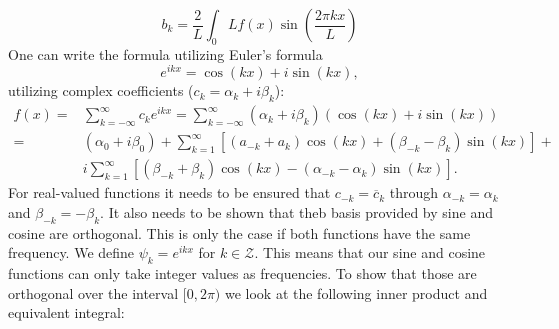 \documentclass[phd,black, hidelinks]{PrincetonThesis}
\newcommand{\compconj}[1]{\overline{#1}}
\newcommand{\euler}{e}
\begin{document}
\begin{equation}
b_k = \frac{2}{L} \int_{0}{L} f(x) \sin \left( \frac{2\pi kx}{L}  \right)
\end{equation}
One can write the formula utilizing Euler's formula
\begin{equation}
\euler^{ikx} = \cos(kx) + i \sin(kx),
\end{equation}
utilizing complex coefficients (\(c_k = \alpha_k + i \beta_k\)):
\begin{equation}
\begin{aligned}
 f(x)={} & \sum_{k=- \infty}^{\infty} c_k \euler^{ikx} = \sum_{k=-\infty}^{\infty} (\alpha_k + i \beta_k) (\cos(kx) + i \sin(kx)) \\
 ={} & (\alpha_0 + i \beta_0) + \sum_{k=1}^{\infty} \left[ (a_{-k} + a_k) \cos(kx) + (\beta_{-k} - \beta_k) \sin(kx) \right] + \\
 & i \sum_{k=1}^{\infty} \left[ (\beta_{-k} + \beta_{k}) \cos(kx) - (\alpha_{-k}  - \alpha_k) \sin(kx)  \right].
\end{aligned}
\end{equation}
For real-valued functions it needs to be ensured that \(c_{-k} = \compconj{c}_k\) through \(\alpha_{-k}= \alpha_k\) and \(\beta_{-k}= - \beta_k\). It also needs to be shown that theb basis provided by sine and cosine are orthogonal. This is only the case if both functions have the same frequency. We define \(\psi_k = \euler^{ikx}\) for \(k \in \mathcal{Z}\). This means that our sine and cosine functions can only take integer values as frequencies. To show that those are orthogonal over the interval \([0,2\pi)\) we look at the following inner product and equivalent integral:
\end{document}
